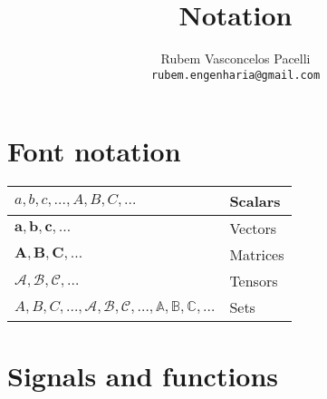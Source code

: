 \documentclass{article}
\begin{document}
\title{\textbf{Notation}  \vspace{-.3cm}}
\author{Rubem Vasconcelos Pacelli\\
{\tt rubem.engenharia@gmail.com}}
\maketitle

\tableofcontents
\newpage

\section{Font notation}
\begin{xltabular}{\textwidth}{XX}
	$a,b,c, \dots, A, B, C, \dots$                                                                            & Scalars  \\ \hline
	$\mathbf{a}, \mathbf{b}, \mathbf{c}, \dots$                                                               & Vectors  \\ \hline
	$\mathbf{A}, \mathbf{B}, \mathbf{C}, \dots$                                                               & Matrices \\ \hline
	$\bm{\mathcal{A}}, \bm{\mathcal{B}}, \bm{\mathcal{C}}, \dots$                                             & Tensors  \\ \hline
	$A, B, C, \dots, \mathcal{A}, \mathcal{B}, \mathcal{C}, \dots, \mathbb{A}, \mathbb{B}, \mathbb{C}, \dots$ & Sets     \\
\end{xltabular}

\section{Signals and functions}
\end{document}
